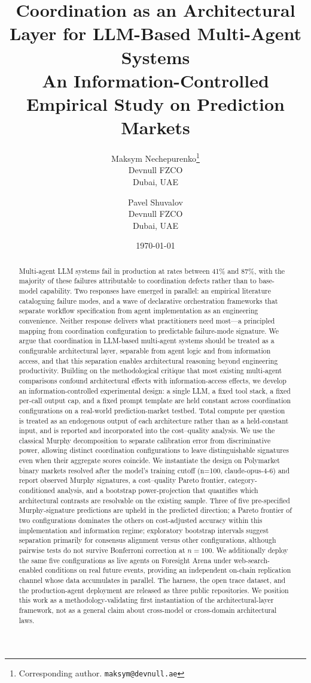 \documentclass[11pt]{article}
\title{Coordination as an Architectural Layer for LLM-Based Multi-Agent Systems\\
\large{An Information-Controlled Empirical Study on Prediction Markets}}
\author{
  Maksym Nechepurenko\thanks{Corresponding author. \texttt{maksym@devnull.ae}}\\
  Devnull FZCO\\
  Dubai, UAE
  \and
  Pavel Shuvalov\\
  Devnull FZCO\\
  Dubai, UAE
}
\date{\today}
\begin{document}
\maketitle

\begin{abstract}
\noindent
Multi-agent LLM systems fail in production at rates between 41\% and 87\%, with the majority of these failures attributable to coordination defects rather than to base-model capability. Two responses have emerged in parallel: an empirical literature cataloguing failure modes, and a wave of declarative orchestration frameworks that separate workflow specification from agent implementation as an engineering convenience. Neither response delivers what practitioners need most---a principled mapping from coordination configuration to predictable failure-mode signature. We argue that coordination in LLM-based multi-agent systems should be treated as a configurable architectural layer, separable from agent logic and from information access, and that this separation enables architectural reasoning beyond engineering productivity. Building on the methodological critique that most existing multi-agent comparisons confound architectural effects with information-access effects, we develop an information-controlled experimental design: a single LLM, a fixed tool stack, a fixed per-call output cap, and a fixed prompt template are held constant across coordination configurations on a real-world prediction-market testbed. Total compute per question is treated as an endogenous output of each architecture rather than as a held-constant input, and is reported and incorporated into the cost--quality analysis. We use the classical Murphy decomposition to separate calibration error from discriminative power, allowing distinct coordination configurations to leave distinguishable signatures even when their aggregate scores coincide. We instantiate the design on Polymarket binary markets resolved after the model's training cutoff (n=100, claude-opus-4-6) and report observed Murphy signatures, a cost--quality Pareto frontier, category-conditioned analysis, and a bootstrap power-projection that quantifies which architectural contrasts are resolvable on the existing sample. Three of five pre-specified Murphy-signature predictions are upheld in the predicted direction; a Pareto frontier of two configurations dominates the others on cost-adjusted accuracy within this implementation and information regime; exploratory bootstrap intervals suggest separation primarily for consensus alignment versus other configurations, although pairwise tests do not survive Bonferroni correction at $n=100$. We additionally deploy the same five configurations as live agents on Foresight Arena under web-search-enabled conditions on real future events, providing an independent on-chain replication channel whose data accumulates in parallel. The harness, the open trace dataset, and the production-agent deployment are released as three public repositories. We position this work as a methodology-validating first instantiation of the architectural-layer framework, not as a general claim about cross-model or cross-domain architectural laws.


\end{abstract}
\end{document}
